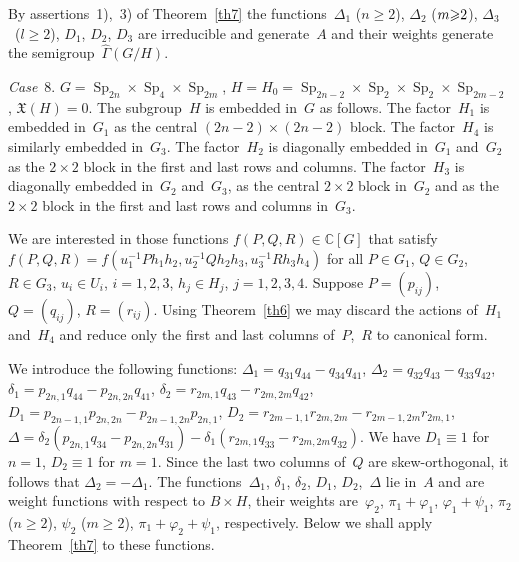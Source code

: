 \documentclass[12pt]{amsart}
\theoremstyle{definition}
\theoremstyle{remark}
\begin{document}
By assertions~1),~3) of Theorem~\ref{th7} the functions~$\Delta_1$
($n{\geqslant}2$), $\Delta_2$ ($m{\geqslant}\nobreak2$), $\Delta_3$~($l{\geqslant}2$),
$D_1$, $D_2$, $D_3$ are irreducible and generate~$A$ and their
weights generate the semigroup~$\widehat\Gamma(G/H)$.

\textsl{Case}~8. $G={\operatorname{Sp}}_{2n}\times {\operatorname{Sp}}_4\times {\operatorname{Sp}}_{2m}$,
$H=H_0={\operatorname{Sp}}_{2n-2}\times {\operatorname{Sp}}_2\times {\operatorname{Sp}}_2\times\allowbreak
{\operatorname{Sp}}_{2m-2}$, $\mathfrak{X}(H)=0$. The subgroup~$H$ is embedded
in~$G$ as follows. The factor~$H_1$ is embedded in~$G_1$ as the
central $(2n-2)\times(2n-2)$ block. The factor~$H_4$ is similarly
embedded in~$G_3$. The factor~$H_2$ is diagonally embedded in~$G_1$
and~$G_2$ as the $2\times 2$ block in the first and last rows and
columns. The factor~$H_3$ is diagonally embedded in~$G_2$ and~$G_3$,
as the central $2\times 2$ block in~$G_2$ and as the $2\times 2$
block in the first and last rows and columns in~$G_3$.

We are interested in those functions $f(P,Q,R)\in \mathbb{C}[G]$
that satisfy
$f(P,Q,R)=f(u_1^{-1}Ph_1h_2,u_2^{-1}Qh_2h_3,u_3^{-1}Rh_3h_4)$ for
all $P\in G_1$, $Q\in G_2$, $R\in G_3$, $u_i\in U_i$, $i=1,2,3$,
$h_j\in H_j$, $j=1,2,3,4$. Suppose $P=(p_{ij})$, $Q=(q_{ij})$,
$R=(r_{ij})$. Using Theorem~\ref{th6} we may discard the actions
of~$H_1$ and~$H_4$ and reduce only the first and last columns
of~$P$,~$R$ to canonical form.

We introduce the following functions:
$\Delta_1=q_{31}q_{44}-q_{34}q_{41}$,
$\Delta_2=q_{32}q_{43}-q_{33}q_{42}$,
$\delta_1=p_{2n,1}q_{44}-p_{2n,2n}q_{41}$,
$\delta_2=r_{2m,1}q_{43}-r_{2m,2m}q_{42}$,
$D_1=p_{2n-1,1}p_{2n,2n}-p_{2n-1,2n}p_{2n,1}$,
$D_2=r_{2m-1,1}r_{2m,2m}-r_{2m-1,2m}r_{2m,1}$,
$\Delta=\delta_2(p_{2n,1}q_{34}-p_{2n,2n}q_{31})-
\delta_1(r_{2m,1}q_{33}-r_{2m,2m}q_{32})$. We have $D_1\equiv1$ for
$n=1$, $D_2\equiv1$ for $m=1$. Since the last two columns of~$Q$ are
skew-orthogonal, it follows that $\Delta_2=-\Delta_1$. The
functions~$\Delta_1$, $\delta_1$, $\delta_2$, $D_1$, $D_2$,~$\Delta$
lie in~$A$ and are weight functions with respect to $B\times H$,
their weights are~$\varphi_2$, $\pi_1+\varphi_1$,
$\varphi_1+\psi_1$, $\pi_2$ ($n{\geqslant}2$), $\psi_2$ ($m{\geqslant}2$),
$\pi_1+\varphi_2+\psi_1$, respectively. Below we shall apply
Theorem~\ref{th7} to these functions.
\end{document}
